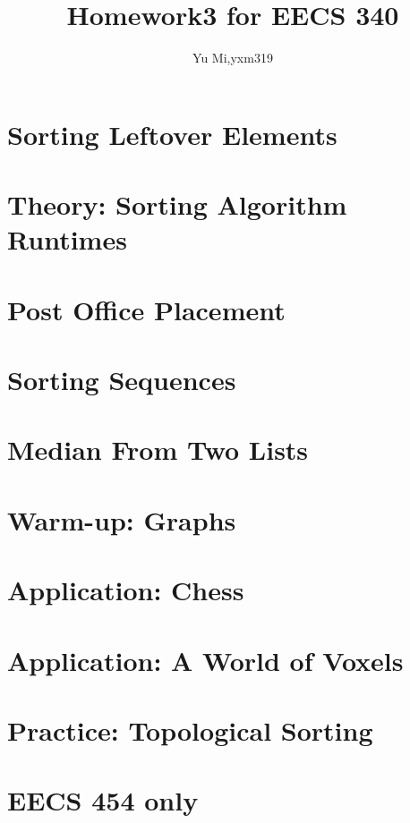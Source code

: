 \documentclass[11pt]{article}
\begin{document}
	\title{Homework3 for EECS 340}
	\author{Yu Mi,yxm319}
	\maketitle
\section{Sorting Leftover Elements}
\section{Theory: Sorting Algorithm Runtimes}
\section{Post Office Placement}
\section{Sorting Sequences}
\section{Median From Two Lists}
\section{Warm-up: Graphs}
\section{Application: Chess}
\section{Application: A World of Voxels}
\section{Practice: Topological Sorting}
\section{EECS 454 only}
\end{document}

